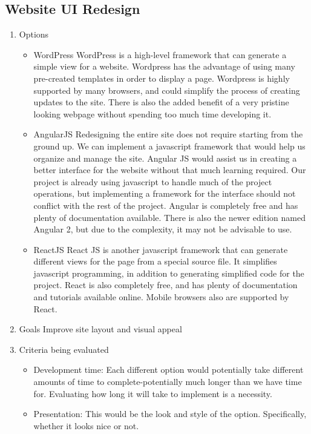 \documentclass[letterpaper, 10pt, draftclsnofoot, compsoc, onecolumn]{IEEEtran}
\begin{document}
	\subsection{Website UI Redesign}
		\begin{enumerate}
			\item{Options}
				\begin{itemize}
					\item{WordPress}
					WordPress is a high-level framework that can generate a simple view for a website. Wordpress has the advantage of using many pre-created templates in order to display a page. Wordpress is highly supported by many browsers, and could simplify the process of creating updates to the site. There is also the added benefit of a very pristine looking webpage without spending too much time developing it.
					\item{AngularJS}
					Redesigning the entire site does not require starting from the ground up. We can implement a javascript framework that would help us organize and manage the site. Angular JS would assist us in creating a better interface for the website without that much learning required. Our project is already using javascript to handle much of the project operations, but implementing a framework for the interface should not conflict with the rest of the project. Angular is completely free and has plenty of documentation available. There is also the newer edition named Angular 2, but due to the complexity, it may not be advisable to use.
					\item{ReactJS}
					React JS is another javascript framework that can generate different views for the page from a special source file. It simplifies javascript programming, in addition to generating simplified code for the project. React is also completely free, and has plenty of documentation and tutorials available online. Mobile browsers also are supported by React.
				\end{itemize}
			\item{Goals}
			Improve site layout and visual appeal
			\item{Criteria being evaluated}
				\begin{itemize}
					\item{Development time:  Each different option would potentially take different amounts of time to complete-potentially much longer than we have time for. Evaluating how long it will take to implement is a necessity.}
					\item{Presentation: This would be the look and style of the option. Specifically, whether it looks nice or not.}

\end{itemize}
\end{enumerate}
\end{document}
